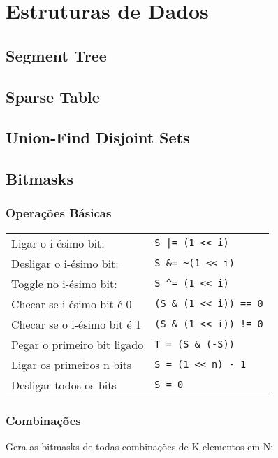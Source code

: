 \section{Estruturas de Dados}

\subsection{Segment Tree}
\divisor

\subsection{Sparse Table}
\divisor

\subsection{Union-Find Disjoint Sets}
\divisor

\subsection{Bitmasks}
\subsubsection{Operações Básicas}
\begin{tabular}{l | l}
		Ligar o i-ésimo bit: 		&   \texttt{S |= (1 << i)} 			\\
		Desligar o i-ésimo bit: 	&	\texttt{S \&= \textasciitilde(1 << i)} 		\\
		Toggle no i-ésimo bit:		&   \texttt{S \textasciicircum= (1 << i)} 			\\
		Checar se i-ésimo bit é 0  	&	\texttt{(S \& (1 << i)) == 0} 	\\
		Checar se o i-ésimo bit é 1 &	\texttt{(S \& (1 << i)) != 0} 	\\
		Pegar o primeiro bit ligado	& 	\texttt{T = (S \& (-S))} 		\\
		Ligar os primeiros n bits	& 	\texttt{S = (1 << n) - 1} 		\\
		Desligar todos os bits		& 	\texttt{S = 0} 
\end{tabular}

\subsubsection{Combinações}
Gera as bitmasks de todas combinações de K elementos em N:

